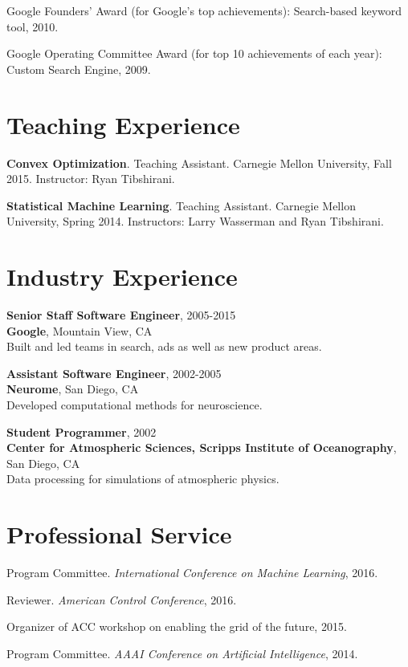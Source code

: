\documentclass[margin, line]{res}
\begin{document}
\begin{resume}
Google Founders' Award (for Google's top achievements): Search-based keyword
tool, 2010.

Google Operating Committee Award (for top 10 achievements of each year): Custom Search Engine, 2009.

\section{Teaching Experience}

{\bf Convex Optimization}. Teaching Assistant. Carnegie Mellon University, Fall
2015. Instructor: Ryan Tibshirani.

{\bf Statistical Machine Learning}. Teaching Assistant. Carnegie Mellon
University, Spring 2014. Instructors: Larry Wasserman and Ryan Tibshirani.

\section{Industry Experience}

{\bf Senior Staff Software Engineer}, 2005-2015 \\
{\bf Google}, Mountain View, CA \\
Built and led teams in search, ads as well as new product areas.

{\bf Assistant Software Engineer}, 2002-2005 \\
{\bf Neurome}, San Diego, CA \\
Developed computational methods for neuroscience.

{\bf Student Programmer}, 2002 \\
{\bf Center for Atmospheric Sciences, Scripps Institute of Oceanography}, San
Diego, CA \\
Data processing for simulations of atmospheric physics.


\section{Professional Service}

Program Committee. \emph{International Conference on Machine Learning}, 2016.

Reviewer. \emph{American Control Conference}, 2016.

Organizer of ACC workshop on enabling the grid of the future, 2015.

Program Committee. \emph{AAAI Conference on Artificial Intelligence}, 2014.


\end{resume}
\end{document}
